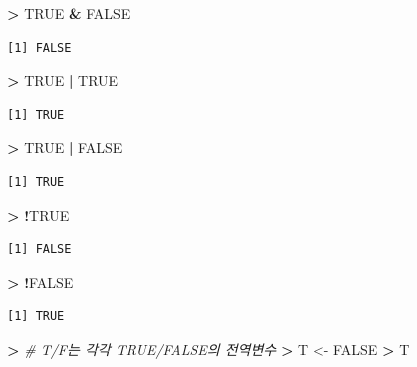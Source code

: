 \documentclass[11pt,a4paper]{book}
\newenvironment{Shaded}{\begin{snugshade}}{\end{snugshade}}
\newcommand{\StringTok}[1]{\textcolor[rgb]{0.31,0.60,0.02}{#1}}
\newcommand{\CommentTok}[1]{\textcolor[rgb]{0.56,0.35,0.01}{\textit{#1}}}
\newcommand{\OtherTok}[1]{\textcolor[rgb]{0.56,0.35,0.01}{#1}}
\newcommand{\OperatorTok}[1]{\textcolor[rgb]{0.81,0.36,0.00}{\textbf{#1}}}
\newcommand{\ErrorTok}[1]{\textcolor[rgb]{0.64,0.00,0.00}{\textbf{#1}}}
\newcommand{\NormalTok}[1]{#1}
\theoremstyle{definition}
\theoremstyle{definition}
\theoremstyle{definition}
\theoremstyle{remark}
\begin{document}
\begin{Shaded}
\begin{Highlighting}[]
\OperatorTok{>}\StringTok{ }\OtherTok{TRUE} \OperatorTok{&}\StringTok{ }\OtherTok{FALSE}
\end{Highlighting}
\end{Shaded}

\begin{verbatim}
[1] FALSE
\end{verbatim}

\begin{Shaded}
\begin{Highlighting}[]
\OperatorTok{>}\StringTok{ }\OtherTok{TRUE} \OperatorTok{|}\StringTok{ }\OtherTok{TRUE}
\end{Highlighting}
\end{Shaded}

\begin{verbatim}
[1] TRUE
\end{verbatim}

\begin{Shaded}
\begin{Highlighting}[]
\OperatorTok{>}\StringTok{ }\OtherTok{TRUE} \OperatorTok{|}\StringTok{ }\OtherTok{FALSE}
\end{Highlighting}
\end{Shaded}

\begin{verbatim}
[1] TRUE
\end{verbatim}

\begin{Shaded}
\begin{Highlighting}[]
\OperatorTok{>}\StringTok{ }\OperatorTok{!}\OtherTok{TRUE}
\end{Highlighting}
\end{Shaded}

\begin{verbatim}
[1] FALSE
\end{verbatim}

\begin{Shaded}
\begin{Highlighting}[]
\OperatorTok{>}\StringTok{ }\OperatorTok{!}\OtherTok{FALSE}
\end{Highlighting}
\end{Shaded}

\begin{verbatim}
[1] TRUE
\end{verbatim}

\begin{Shaded}
\begin{Highlighting}[]
\OperatorTok{>}\StringTok{ }\CommentTok{# T/F는 각각 TRUE/FALSE의 전역변수}
\ErrorTok{>}\StringTok{ }\NormalTok{T <-}\StringTok{ }\OtherTok{FALSE}
\OperatorTok{>}\StringTok{ }\NormalTok{T}
\end{Highlighting}
\end{Shaded}
\end{document}
